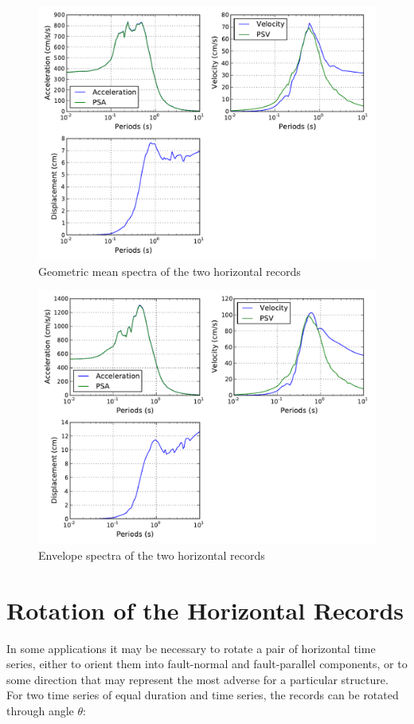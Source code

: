 \begin{figure}[htb]
	\centering
		\includegraphics[width=12cm]{./figures/ims/geometric_mean_spectrum.pdf}
	\caption{Geometric mean spectra of the two horizontal records}
	\label{fig:geometric}
\end{figure}
\begin{figure}[htb]
	\centering
		\includegraphics[width=12cm]{./figures/ims/envelope_spectrum.pdf}
	\caption{Envelope spectra of the two horizontal records}
	\label{fig:envelope}
\end{figure}

\section{Rotation of the Horizontal Records}

In some applications it may be necessary to rotate a pair of horizontal time series, either to orient them into fault-normal and fault-parallel components, or to some direction that may represent the most adverse for a particular structure. For two time series of equal duration and time series, the records can be rotated through angle $\theta$:

